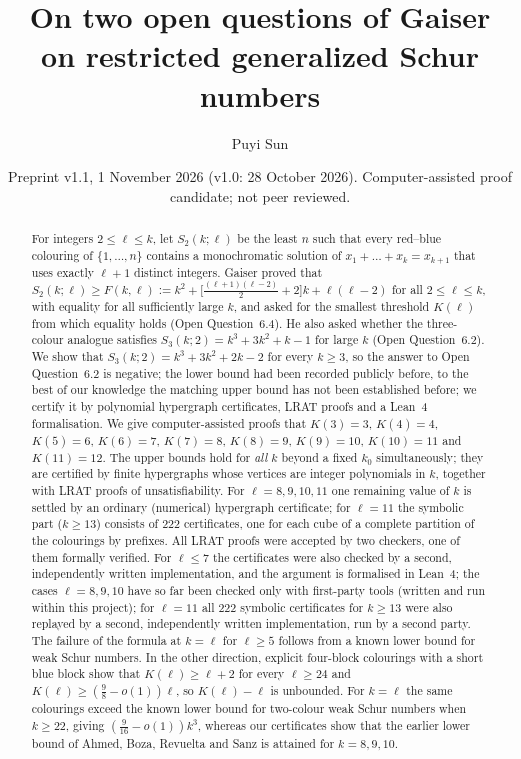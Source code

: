 \documentclass[11pt]{amsart}
\title[Two open questions on restricted generalized Schur numbers]{On two open questions of Gaiser on restricted generalized Schur numbers}
\author{Puyi Sun}
\date{Preprint v1.1, 1 November 2026 (v1.0: 28 October 2026). Computer-assisted proof candidate; not peer reviewed.}
\theoremstyle{definition}
\newcommand{\F}{F}
\newcommand{\Stwo}{S_2}
\begin{document}
\begin{abstract}
For integers $2\le \ell\le k$, let $\Stwo(k;\ell)$ be the least $n$ such that every red--blue colouring of $\{1,\dots,n\}$ contains a monochromatic solution of $x_1+\dots+x_k=x_{k+1}$ that uses exactly $\ell+1$ distinct integers. Gaiser proved that $\Stwo(k;\ell)\ge \F(k,\ell):=k^2+\bigl[\tfrac{(\ell+1)(\ell-2)}{2}+2\bigr]k+\ell(\ell-2)$ for all $2\le\ell\le k$, with equality for all sufficiently large $k$, and asked for the smallest threshold $K(\ell)$ from which equality holds (Open Question~6.4). He also asked whether the three-colour analogue satisfies $S_3(k;2)=k^3+3k^2+k-1$ for large $k$ (Open Question~6.2). We show that $S_3(k;2)=k^3+3k^2+2k-2$ for every $k\ge3$, so the answer to Open Question~6.2 is negative; the lower bound had been recorded publicly before, to the best of our knowledge the matching upper bound has not been established before; we certify it by polynomial hypergraph certificates, LRAT proofs and a Lean~4 formalisation. We give computer-assisted proofs that $K(3)=3$, $K(4)=4$, $K(5)=6$, $K(6)=7$, $K(7)=8$, $K(8)=9$, $K(9)=10$, $K(10)=11$ and $K(11)=12$. The upper bounds hold for \emph{all} $k$ beyond a fixed $k_0$ simultaneously; they are certified by finite hypergraphs whose vertices are integer polynomials in $k$, together with LRAT proofs of unsatisfiability. For $\ell=8,9,10,11$ one remaining value of $k$ is settled by an ordinary (numerical) hypergraph certificate; for $\ell=11$ the symbolic part ($k\ge13$) consists of 222 certificates, one for each cube of a complete partition of the colourings by prefixes. All LRAT proofs were accepted by two checkers, one of them formally verified. For $\ell\le7$ the certificates were also checked by a second, independently written implementation, and the argument is formalised in Lean~4; the cases $\ell=8,9,10$ have so far been checked only with first-party tools (written and run within this project); for $\ell=11$ all 222 symbolic certificates for $k\ge13$ were also replayed by a second, independently written implementation, run by a second party. The failure of the formula at $k=\ell$ for $\ell\ge5$ follows from a known lower bound for weak Schur numbers. In the other direction, explicit four-block colourings with a short blue block show that $K(\ell)\ge\ell+2$ for every $\ell\ge24$ and $K(\ell)\ge(\tfrac98-o(1))\ell$, so $K(\ell)-\ell$ is unbounded. For $k=\ell$ the same colourings exceed the known lower bound for two-colour weak Schur numbers when $k\ge22$, giving $(\tfrac9{16}-o(1))k^3$, whereas our certificates show that the earlier lower bound of Ahmed, Boza, Revuelta and Sanz is attained for $k=8,9,10$.
\end{abstract}
\end{document}
